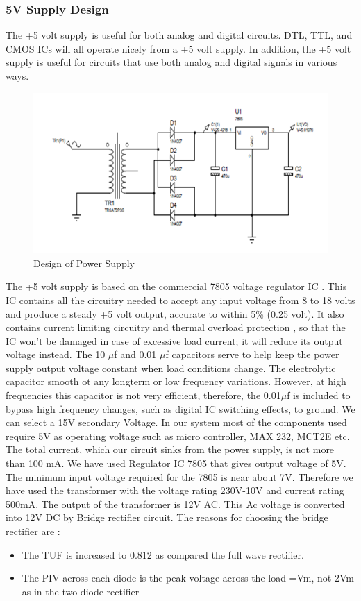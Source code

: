 \documentclass[12pt,a4paper,oneside,openright]{report}
\begin{document}
\subsubsection{5V Supply Design}
The +5 volt supply is useful for both analog and digital circuits. DTL, TTL, and CMOS ICs will all operate nicely from a +5 volt supply. In addition, the +5 volt supply is useful for circuits that use both analog and digital signals in various ways.
\begin{figure}[!h]
 \centering
 \includegraphics[width = \textwidth]{Figures/24.jpg}
 \caption{Design of Power Supply}
 \label{Design of Power Supply}
\end{figure}

The +5 volt supply is based on the commercial 7805 voltage regulator IC . This IC contains all the circuitry needed to accept any input voltage from 8 to 18 volts and produce a steady +5 volt output, accurate to within 5\% (0.25 volt). 
It also contains current limiting circuitry and thermal overload protection , so that the IC won’t be damaged in case of excessive load current; 
it will reduce its output voltage instead. The 10 $\mu$f and 0.01 $\mu$f capacitors serve to help keep the power supply output voltage constant when load conditions change. The electrolytic capacitor smooth ot any longterm or low frequency variations. However, at high frequencies this capacitor is not very efficient, therefore, the 0.01$\mu$f is included to bypass high frequency changes, such as digital IC switching effects, to ground. We can select a 15V secondary Voltage. In our system most of the components used require 5V as operating voltage such as micro controller, MAX 232, MCT2E etc. The total current, which our circuit sinks from the power supply, is not more than 100 mA. We have used Regulator IC 7805 that gives output voltage of 5V. The minimum input voltage required for the 7805 is near about 7V. Therefore we have used the transformer with the voltage rating 230V-10V and current rating 500mA. The output of the transformer is 12V AC. This Ac voltage is converted into 12V DC by Bridge rectifier circuit. 
The reasons for choosing the bridge rectifier are :
\begin{itemize}
 \item The TUF is increased to 0.812 as compared the full wave rectifier.
\item The PIV across each diode is the peak voltage across the load =Vm, not 2Vm as in the two diode rectifier
\end{itemize}
\end{document}
